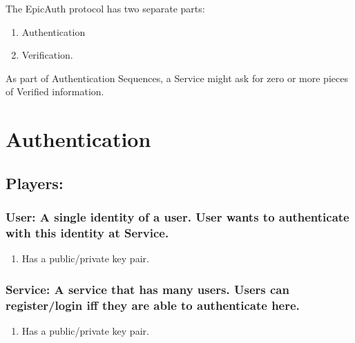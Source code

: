 \documentclass[11pt]{article}
\author{W-M}
\date{\today}
\title{}
\begin{document}
\tableofcontents

The EpicAuth protocol has two separate parts:

\begin{enumerate}
\item Authentication
\item Verification.
\end{enumerate}

As part of Authentication Sequences, a Service might ask for zero or more pieces of Verified information.


\section{Authentication}
\label{sec:org9f71c4c}
\subsection{Players:}
\label{sec:org28718c6}
\subsubsection{User: A single identity of a user. User wants to authenticate with this identity at Service.}
\label{sec:org69064d1}
\begin{enumerate}
\item Has a public/private key pair.
\label{sec:org62c8df5}
\end{enumerate}
\subsubsection{Service: A service that has many users. Users can register/login iff they are able to authenticate here.}
\label{sec:org230d7a7}
\begin{enumerate}
\item Has a public/private key pair.
\label{sec:org4195690}
\end{enumerate}
\end{document}
